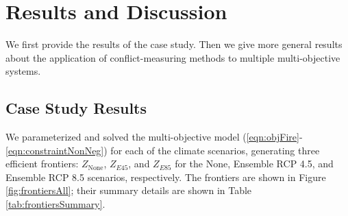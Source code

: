 \section{Results and Discussion}
\label{sec:results}
We first provide the results of the case study. Then we give more general results about the application of conflict-measuring methods to multiple multi-objective systems.

\subsection{Case Study Results}
We parameterized and solved the multi-objective model (\eqref{eqn:objFire}-\eqref{eqn:constraintNonNeg}) for each of the climate scenarios, generating three efficient frontiers: $Z_{\text{None}}$, $Z_{E45}$, and $Z_{E85}$ for the None, Ensemble RCP 4.5, and Ensemble RCP 8.5 scenarios, respectively. The frontiers are shown in Figure \ref{fig:frontiersAll}; their summary details are shown in Table \ref{tab:frontiersSummary}.

